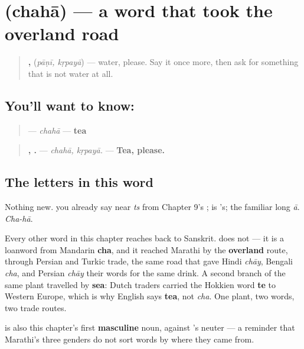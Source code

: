 \section[chahā]{ (chahā) — a word that took the overland road}

\label{lesson:MR-C10-chaha}



\begin{quote}
\textbf{, } (\emph{pāṇī, kṛpayā}) — water, please. Say it once more, then ask for something that is not water at all.
\end{quote}

\subsection*{You'll want to know: }
\begin{quote}
\textbf{} — \emph{chahā} — \textbf{tea}
\end{quote}

\begin{quote}
\textbf{, .} — \emph{chahā, kṛpayā.} — \textbf{Tea, please.}
\end{quote}

\subsection*{The letters in this word}
Nothing new. \textbf{} you already say near \emph{ts} from Chapter 9's \textbf{}; \textbf{} is \textbf{}'s; \textbf{} the familiar long \emph{ā}. \emph{Cha-hā}.

\begin{cousinweb}
Every other word in this chapter reaches back to Sanskrit. \textbf{} does not — it is a loanword from Mandarin \textbf{cha}, and it reached Marathi by the \textbf{overland} route, through Persian and Turkic trade, the same road that gave Hindi \textbf{} \emph{chāy}, Bengali \emph{cha}, and Persian \emph{chāy} their words for the same drink. A second branch of the same plant travelled by \textbf{sea}: Dutch traders carried the Hokkien word \textbf{te} to Western Europe, which is why English says \textbf{tea}, not \emph{cha}. One plant, two words, two trade routes.

\textbf{} is also this chapter's first \textbf{masculine} noun, against \textbf{}'s neuter — a reminder that Marathi's three genders do not sort words by where they came from.
\end{cousinweb}

